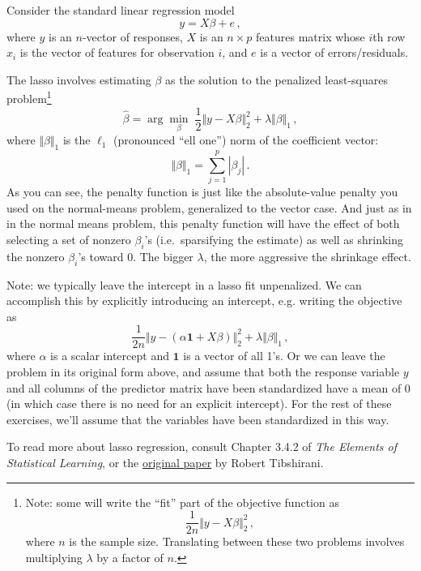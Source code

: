 \documentclass{article}
\begin{document}
Consider the standard linear regression model
$$
y = X \beta + e \, ,
$$
where $y$ is an $n$-vector of responses, $X$ is an $n \times p$ features matrix whose $i$th row $x_i$ is the vector of features for observation $i$, and $e$ is a vector of errors/residuals.

The lasso involves estimating $\beta$ as the solution to the penalized least-squares problem\footnote{Note: some will write the ``fit'' part of the objective function as
$$
\frac{1}{2n} \Vert y - X \beta \Vert_2^2 \, ,
$$
where $n$ is the sample size.  Translating between these two problems involves multiplying $\lambda$ by a factor of $n$.
}
$$
\hat{\beta} = \arg \min_{\beta} \; \frac{1}{2} \Vert y - X \beta \Vert_2^2 + \lambda \Vert \beta \Vert_1 \, ,
$$
where $\Vert \beta \Vert_1$ is the $\ell_1$ (pronounced ``ell one'') norm of the coefficient vector:
$$
\Vert \beta \Vert_1 = \sum_{j=1}^p |\beta_j| \, .
$$
As you can see, the penalty function is just like the absolute-value penalty you used on the normal-means problem, generalized to the vector case.  And just as in in the normal means problem, this penalty function will have the effect of both selecting a set of nonzero $\beta_i$'s (i.e.~sparsifying the estimate) as well as shrinking the nonzero $\beta_i$'s toward 0.  The bigger $\lambda$, the more aggressive the shrinkage effect.

Note: we typically leave the intercept in a lasso fit unpenalized.  We can accomplish this by explicitly introducing an intercept, e.g. writing the objective as
$$
\frac{1}{2n} \Vert y - (\alpha \mathbf{1} + X \beta) \Vert_2^2 + \lambda \Vert \beta \Vert_1 \, ,
$$
where $\alpha$ is a scalar intercept and $\mathbf{1}$ is a vector of all 1's.  Or we can leave the problem in its original form above, and assume that both the response variable $y$ and all columns of the predictor matrix have been standardized have a mean of 0 (in which case there is no need for an explicit intercept).  For the rest of these exercises, we'll assume that the variables have been standardized in this way.

To read more about lasso regression, consult Chapter 3.4.2 of \textit{The Elements of Statistical Learning}, or the \href{http://statweb.stanford.edu/~tibs/lasso/lasso.pdf}{original paper} by Robert Tibshirani.
\end{document}
